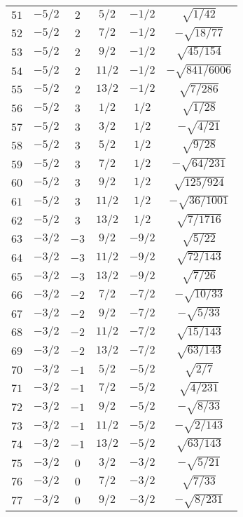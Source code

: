 \begin{table}
\begin{center}
\begin{tabular}{|c|c|c|c|c|c|}
$51$ & $-5/2$ & $2$ & $5/2$ & $-1/2$ & $\sqrt{1/42}$ \\ 
$52$ & $-5/2$ & $2$ & $7/2$ & $-1/2$ & $-\sqrt{18/77}$ \\ 
$53$ & $-5/2$ & $2$ & $9/2$ & $-1/2$ & $\sqrt{45/154}$ \\ 
$54$ & $-5/2$ & $2$ & $11/2$ & $-1/2$ & $-\sqrt{841/6006}$ \\ 
$55$ & $-5/2$ & $2$ & $13/2$ & $-1/2$ & $\sqrt{7/286}$ \\ 
$56$ & $-5/2$ & $3$ & $1/2$ & $1/2$ & $\sqrt{1/28}$ \\ 
$57$ & $-5/2$ & $3$ & $3/2$ & $1/2$ & $-\sqrt{4/21}$ \\ 
$58$ & $-5/2$ & $3$ & $5/2$ & $1/2$ & $\sqrt{9/28}$ \\ 
$59$ & $-5/2$ & $3$ & $7/2$ & $1/2$ & $-\sqrt{64/231}$ \\ 
$60$ & $-5/2$ & $3$ & $9/2$ & $1/2$ & $\sqrt{125/924}$ \\ 
$61$ & $-5/2$ & $3$ & $11/2$ & $1/2$ & $-\sqrt{36/1001}$ \\ 
$62$ & $-5/2$ & $3$ & $13/2$ & $1/2$ & $\sqrt{7/1716}$ \\ 
$63$ & $-3/2$ & $-3$ & $9/2$ & $-9/2$ & $\sqrt{5/22}$ \\ 
$64$ & $-3/2$ & $-3$ & $11/2$ & $-9/2$ & $\sqrt{72/143}$ \\ 
$65$ & $-3/2$ & $-3$ & $13/2$ & $-9/2$ & $\sqrt{7/26}$ \\ 
$66$ & $-3/2$ & $-2$ & $7/2$ & $-7/2$ & $-\sqrt{10/33}$ \\ 
$67$ & $-3/2$ & $-2$ & $9/2$ & $-7/2$ & $-\sqrt{5/33}$ \\ 
$68$ & $-3/2$ & $-2$ & $11/2$ & $-7/2$ & $\sqrt{15/143}$ \\ 
$69$ & $-3/2$ & $-2$ & $13/2$ & $-7/2$ & $\sqrt{63/143}$ \\ 
$70$ & $-3/2$ & $-1$ & $5/2$ & $-5/2$ & $\sqrt{2/7}$ \\ 
$71$ & $-3/2$ & $-1$ & $7/2$ & $-5/2$ & $\sqrt{4/231}$ \\ 
$72$ & $-3/2$ & $-1$ & $9/2$ & $-5/2$ & $-\sqrt{8/33}$ \\ 
$73$ & $-3/2$ & $-1$ & $11/2$ & $-5/2$ & $-\sqrt{2/143}$ \\ 
$74$ & $-3/2$ & $-1$ & $13/2$ & $-5/2$ & $\sqrt{63/143}$ \\ 
$75$ & $-3/2$ & $0$ & $3/2$ & $-3/2$ & $-\sqrt{5/21}$ \\ 
$76$ & $-3/2$ & $0$ & $7/2$ & $-3/2$ & $\sqrt{7/33}$ \\ 
$77$ & $-3/2$ & $0$ & $9/2$ & $-3/2$ & $-\sqrt{8/231}$ \\ 

\end{tabular}
\end{center}
\end{table}
